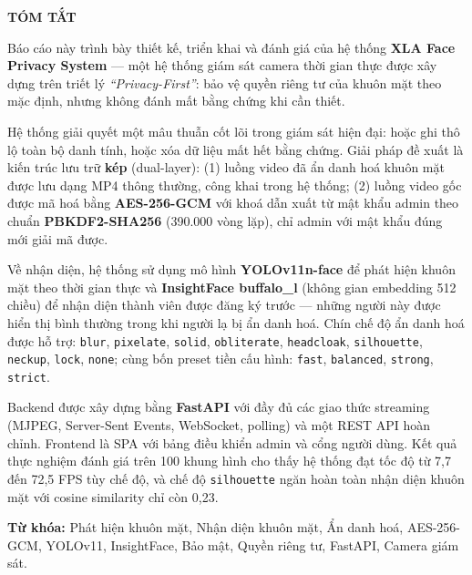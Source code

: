 \documentclass[12pt,a4paper]{article}
\numberwithin{equation}{section}
\numberwithin{figure}{section}
\numberwithin{table}{section}
\begin{document}
\newpage
\pagestyle{fancy}
\begin{center}
    \textbf{\large TÓM TẮT}
\end{center}
\medskip

Báo cáo này trình bày thiết kế, triển khai và đánh giá của hệ thống \textbf{XLA Face Privacy System} --- một hệ thống giám sát camera thời gian thực được xây dựng trên triết lý \textit{``Privacy-First''}: bảo vệ quyền riêng tư của khuôn mặt theo mặc định, nhưng không đánh mất bằng chứng khi cần thiết.

\medskip
Hệ thống giải quyết một mâu thuẫn cốt lõi trong giám sát hiện đại: hoặc ghi thô lộ toàn bộ danh tính, hoặc xóa dữ liệu mất hết bằng chứng. Giải pháp đề xuất là kiến trúc lưu trữ \textbf{kép} (dual-layer): (1) luồng video đã ẩn danh hoá khuôn mặt được lưu dạng MP4 thông thường, công khai trong hệ thống; (2) luồng video gốc được mã hoá bằng \textbf{AES-256-GCM} với khoá dẫn xuất từ mật khẩu admin theo chuẩn \textbf{PBKDF2-SHA256} (390.000 vòng lặp), chỉ admin với mật khẩu đúng mới giải mã được.

\medskip
Về nhận diện, hệ thống sử dụng mô hình \textbf{YOLOv11n-face} để phát hiện khuôn mặt theo thời gian thực và \textbf{InsightFace buffalo\_l} (không gian embedding 512 chiều) để nhận diện thành viên được đăng ký trước --- những người này được hiển thị bình thường trong khi người lạ bị ẩn danh hoá. Chín chế độ ẩn danh hoá được hỗ trợ: \texttt{blur}, \texttt{pixelate}, \texttt{solid}, \texttt{obliterate}, \texttt{headcloak}, \texttt{silhouette}, \texttt{neckup}, \texttt{lock}, \texttt{none}; cùng bốn preset tiền cấu hình: \texttt{fast}, \texttt{balanced}, \texttt{strong}, \texttt{strict}.

\medskip
Backend được xây dựng bằng \textbf{FastAPI} với đầy đủ các giao thức streaming (MJPEG, Server-Sent Events, WebSocket, polling) và một REST API hoàn chỉnh. Frontend là SPA với bảng điều khiển admin và cổng người dùng. Kết quả thực nghiệm đánh giá trên 100 khung hình cho thấy hệ thống đạt tốc độ từ 7,7 đến 72,5 FPS tùy chế độ, và chế độ \texttt{silhouette} ngăn hoàn toàn nhận diện khuôn mặt với cosine similarity chỉ còn 0,23.

\medskip
\noindent\textbf{Từ khóa:} Phát hiện khuôn mặt, Nhận diện khuôn mặt, Ẩn danh hoá, AES-256-GCM, YOLOv11, InsightFace, Bảo mật, Quyền riêng tư, FastAPI, Camera giám sát.
\end{document}
